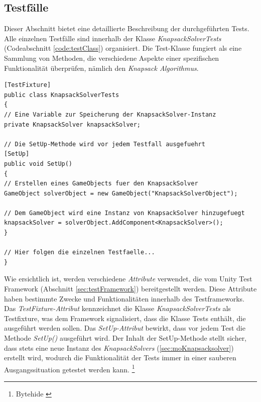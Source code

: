 \subsection{\label{sec:tests}Testfälle}

Dieser Abschnitt bietet eine detaillierte Beschreibung der durchgeführten Tests. Alle einzelnen Testfälle sind innerhalb der Klasse \textit{KnapsackSolverTests} (Codeabschnitt \ref{code:testClass}) organisiert. Die Test-Klasse fungiert als eine Sammlung von Methoden, die verschiedene Aspekte einer spezifischen Funktionalität überprüfen, nämlich den \textit{Knapsack Algorithmus}.

\begin{lstlisting}[style=csharp, caption={Auszug aus der Test-Klasse}, label={code:testClass}]
[TestFixture]
public class KnapsackSolverTests
{
// Eine Variable zur Speicherung der KnapsackSolver-Instanz
private KnapsackSolver knapsackSolver;

// Die SetUp-Methode wird vor jedem Testfall ausgefuehrt
[SetUp]
public void SetUp()
{
// Erstellen eines GameObjects fuer den KnapsackSolver
GameObject solverObject = new GameObject("KnapsackSolverObject");

// Dem GameObject wird eine Instanz von KnapsackSolver hinzugefuegt
knapsackSolver = solverObject.AddComponent<KnapsackSolver>();
}

// Hier folgen die einzelnen Testfaelle...
}
\end{lstlisting}

Wie ersichtlich ist, werden verschiedene \textit{Attribute} verwendet, die vom Unity Test Framework (Abschnitt \ref{sec:testFramework}) bereitgestellt werden. Diese Attribute haben bestimmte Zwecke und Funktionalitäten innerhalb des Testframeworks. Das \textit{TestFixture-Attribut} kennzeichnet die Klasse \textit{KnapsackSolverTests} als Testfixture, was dem Framework signalisiert, dass die Klasse Tests enthält, die ausgeführt werden sollen. Das \textit{SetUp-Attribut} bewirkt, dass vor jedem Test die Methode \textit{SetUp()} ausgeführt wird. Der Inhalt der SetUp-Methode stellt sicher, dass stets eine neue Instanz des \textit{KnapsackSolvers} (\ref{sec:moKnapsacksolver}) erstellt wird, wodurch die Funktionalität der Tests immer in einer sauberen Ausgangssituation
getestet werden kann. \footnote{Bytehide \cite{AttributesCSharp}}


